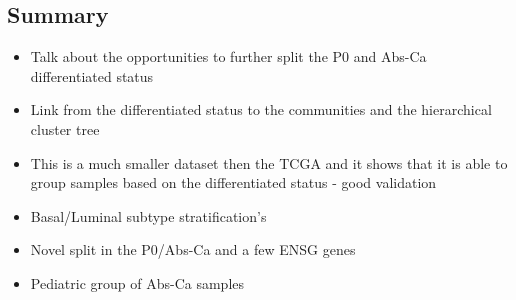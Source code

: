 \subsection{Summary}

\begin{itemize}
    \item Talk about the opportunities to further split the P0 and Abs-Ca differentiated status 
    \item Link from the differentiated status to the communities and the hierarchical cluster tree
    \item This is a much smaller dataset then the TCGA and it shows that it is able to group samples based on the differentiated status - good validation
    \item Basal/Luminal subtype stratification's
    \item Novel split in the P0/Abs-Ca and a few ENSG genes
    \item Pediatric group of Abs-Ca samples
\end{itemize}